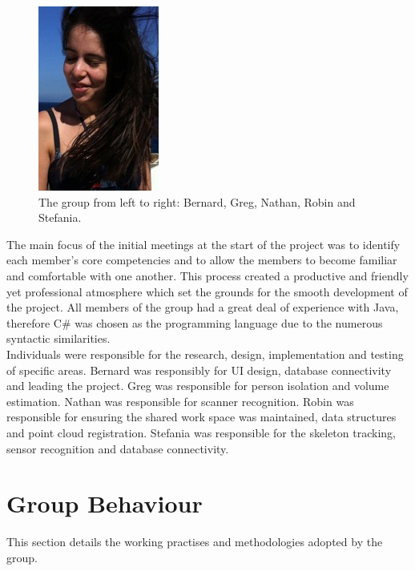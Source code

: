 \begin{figure}[h]
\begin{center}
        \includegraphics[scale=0.5]{images/stef} 
        \end{center}
        \caption{The group from left to right: Bernard, Greg, Nathan, Robin and Stefania.}
    \label{fig:the group}
\end{figure}

The main focus of the initial meetings at the start of the project was to identify each member’s core competencies and to allow the members to become familiar and comfortable with one another. This process created a productive and friendly yet professional atmosphere which set the grounds for the smooth development of the project. All members of the group had a great deal of experience with Java, therefore C\# was chosen as the programming language due to the numerous syntactic similarities. \\

Individuals were responsible for the research, design, implementation and testing of specific areas. Bernard was responsibly for UI design, database connectivity and leading the project. Greg was responsible for person isolation and volume estimation. Nathan was responsible for scanner recognition. Robin was responsible for ensuring the shared work space was maintained, data structures and point cloud registration. Stefania was responsible for the skeleton tracking, sensor recognition and database connectivity. \\

\section{Group Behaviour}
This section details the working practises and methodologies adopted by the group. \\

